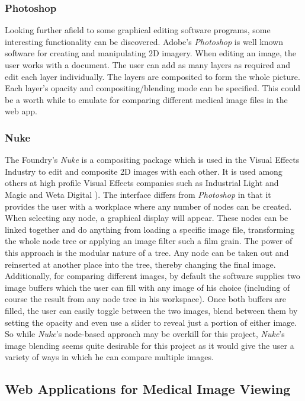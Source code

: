 \documentclass[a4paper,11pt,titlepage]{article}
\begin{document}
\subsubsection{Photoshop}
Looking further afield to some graphical editing software programs, some interesting functionality can be discovered. Adobe's \textit{Photoshop} is well known software for creating and manipulating 2D imagery. When editing an image, the user works with a document. The user can add as many layers as required and edit each layer individually. The layers are composited to form the whole picture. Each layer's opacity and compositing/blending mode can be specified. This could be a worth while to emulate for comparing different medical image files in the web app.



\subsubsection{Nuke}
The Foundry's \textit{Nuke} is a compositing package which is used in the Visual Effects Industry to edit and composite 2D images with each other. It is used among others at high profile Visual Effects companies such as Industrial Light and Magic and Weta Digital\cite{nuke1} \cite{nuke2}). The interface differs from \textit{Photoshop} in that it provides the user with a workplace where any number of nodes can be created. When selecting any node, a graphical display will appear. These nodes can be linked together and do anything from loading a specific image file, transforming the whole node tree or applying an image filter such a film grain. The power of this approach is the modular nature of a tree. Any node can be taken out and reinserted at another place into the tree, thereby changing the final image. Additionally, for comparing different images, by default the software supplies two image buffers which the user can fill with any image of his choice (including of course the result from any node tree in his workspace). Once both buffers are filled, the user can easily toggle between the two images, blend between them by setting the opacity and even use a slider to reveal just a portion of either image. So while \textit{Nuke}'s node-based approach may be overkill for this project, \textit{Nuke}'s image blending seems quite desirable for this project as it would give the user a variety of ways in which he can compare multiple images. 


\subsection{Web Applications for Medical Image Viewing}
\end{document}
